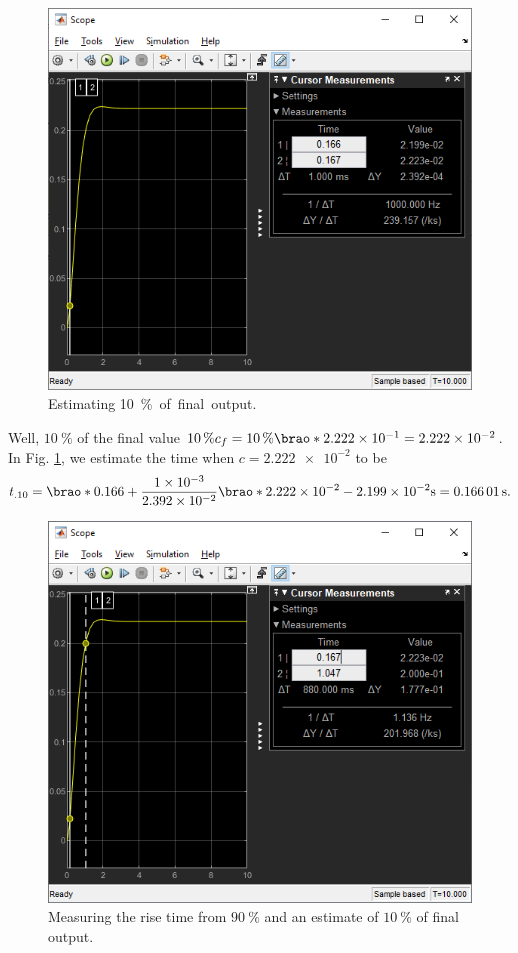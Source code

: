 \documentclass[12pt]{article}
\DeclarePairedDelimiter\brao()%
\begin{document}
\begin{figure}[h]
    \centering
    \includegraphics[width=\linewidth]{part01a_measuring_pc10.png}
    \caption{Estimating \SI{10}\percent of final output.}
    \label{fig:step - estimating 10 percent}
\end{figure}

Well, $\SI{10}\percent$ of the final value $\SI{10}\percent c_f = \SI{10}\percent \brao*{\num{2.222e-1}} = \num{2.222e-2}$.
In Fig. \ref{fig:step - estimating 10 percent}, we estimate the time when $c = \num{2.222e-2}$ to be
$$
	t_{.10} = \brao*{0.166 + \frac{\num{1e-3}}{\num{2.392e-02}}\brao*{\num{2.222e-2} - \num{2.199e-2}}}\si\second = \SI{0.16601}\second.
$$

\begin{figure}[h]
    \centering
    \includegraphics[width=\linewidth]{part01a_measuring_rise_time_estimate_+=.png}
    \caption{Measuring the rise time from $\SI{90}\percent$ and an estimate of $\SI{10}\percent$ of final output.}
    \label{fig:step - measuring rising time}
\end{figure}
\end{document}
